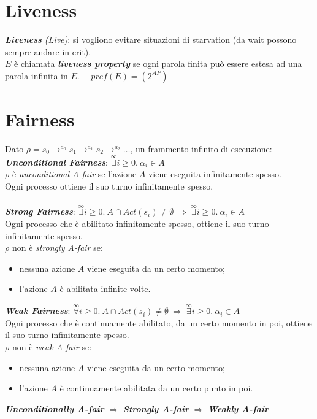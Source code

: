\documentclass[a4paper, notitlepage, 9pt]{extreport}
\begin{document}
\section*{Liveness}
\textit{\textbf{Liveness} (Live)}: si vogliono evitare situazioni di starvation (da wait possono sempre andare in crit).\\
$E$ è chiamata \textit{\textbf{liveness property}} se ogni parola finita può essere estesa ad una parola infinita in $E$. ~~$pref(E) = (2^{AP})$


\section*{Fairness}
Dato $\rho = s_0 \rightarrow^{a_0} s_1 \rightarrow^{a_1} s_2 \rightarrow^{a_2} \dots$, un frammento infinito di esecuzione:\\
\textit{\textbf{Unconditional Fairness}}: $\stackrel{\infty}{\exists} i \geq 0. ~\alpha_i \in A$\\
$\rho$ è \textit{unconditional A-fair} se l'azione $A$ viene eseguita infinitamente spesso.\\
Ogni processo ottiene il suo turno infinitamente spesso.\\\\
\textit{\textbf{Strong Fairness}}: $\stackrel{\infty}{\exists} i \geq 0. ~A \cap Act(s_i) \neq \emptyset ~\Longrightarrow~ \stackrel{\infty}{\exists} i \geq 0. ~\alpha_i \in A$\\
Ogni processo che è abilitato infinitamente spesso, ottiene il suo turno infinitamente spesso.\\
$\rho$ non è \textit{strongly A-fair} se:
\begin{itemize}
	\item nessuna azione $A$ viene eseguita da un certo momento;
	\item l'azione $A$ è abilitata infinite volte.
\end{itemize}
\textit{\textbf{Weak Fairness}}: $\stackrel{\infty}{\forall} i \geq 0. ~A \cap Act(s_i) \neq \emptyset ~\Longrightarrow~ \stackrel{\infty}{\exists} i \geq 0. ~\alpha_i \in A$\\
Ogni processo che è continuamente abilitato, da un certo momento in poi, ottiene il suo turno infinitamente spesso.\\
$\rho$ non è \textit{weak A-fair} se:
\begin{itemize}
	\item nessuna azione $A$ viene eseguita da un certo momento;
	\item l'azione $A$ è continuamente abilitata da un certo punto in poi.
\end{itemize}
\textit{\textbf{Unconditionally A-fair}} $\Rightarrow$ \textit{\textbf{Strongly A-fair}} $\Rightarrow$ \textit{\textbf{Weakly A-fair}}
\end{document}
